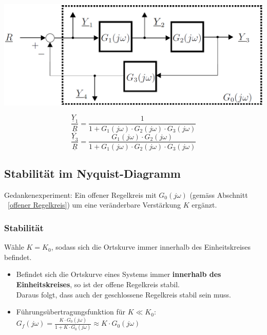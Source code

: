\begin{minipage}[c]{0.5\columnwidth}
    \includegraphics[width=\columnwidth]{images/kreisschaltung_mehrere_bloecke.png}
\end{minipage}
\hfill
\begin{minipage}[c]{0.48\columnwidth}
    $$ \frac{\underline{Y}_1}{\underline{R}} = \frac{1}{1 + G_1(j \omega) \cdot G_2(j \omega) \cdot G_3(j \omega)} $$
    $$ \frac{\underline{Y}_3}{\underline{R}} = \frac{G_1(j \omega) \cdot G_2(j \omega)}{1 + G_1(j \omega) \cdot G_2(j \omega) \cdot G_3(j \omega)} $$
    
\end{minipage}


\subsection{Stabilität im Nyquist-Diagramm}

Gedankenexperiment: Ein offener Regelkreis mit $G_0(j \omega)$ (gemäss Abschnitt ~\ref{offener Regelkreis}) um eine 
veränderbare Verstärkung $K$ ergänzt.


\subsubsection{Stabilität}

Wähle $K = K_0$, sodass sich die Ortskurve immer innerhalb des Einheitskreises befindet.
\vspace{0.1cm}
\begin{itemize}
    \item Befindet sich die Ortskurve eines Systems immer \textbf{innerhalb des Einheitskreises}, so ist der offene Regelkreis stabil. \\
        \textrightarrow Daraus folgt, dass auch der geschlossene Regelkreis stabil sein muss.
    \item Führungsübertragungsfunktion für $K \ll K_0$:\\
    $G_f(j \omega) = \frac{K \cdot G_0(j \omega)}{1 + K \cdot G_0(j \omega)} \approx K \cdot G_0(j \omega)$ 
\end{itemize}


